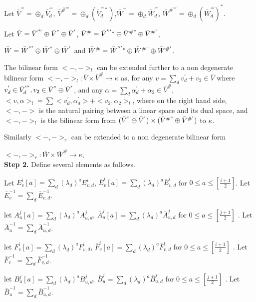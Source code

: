 \def\CTEXPreproc{Created by ctex v0.2.12, don't edit!}\documentclass[11pt]{article}
\begin{document}
\begin{pf}
     Let $\bar{V}^{'''}= \oplus_d \bar{V}^{'''}_d$, $\bar{V}^{\# '''}= \oplus_d ( \bar{V}^{ ''' *}_d ) $,$\bar{W}^{'''}= \oplus_d \bar{W}^{'''}_d$,
     $\bar{W}^{\# '''}= \oplus_d (\bar{W}^{'''}_d )^* $.

     Let $\bar{V}= \bar{V}^{'''}\oplus \bar{V}^{"} \oplus \bar{V}^{'}$,  $\bar{V}^{\#} = \bar{V}^{'''*}\oplus \bar{V}^{\# "} \oplus \bar{V}^{\# '}$,

      $\bar{W}= \bar{W}^{'''}\oplus \bar{W}^{"} \oplus \bar{W}^{'}$ and $\bar{W}^{\#} = \bar{W}^{'''*}\oplus \bar{W}^{\# "} \oplus \bar{W}^{\# '}$.

     The bilinear form $<-,->_l$ can be extended further to a non degenerate bilinear form $<-,->_l : \bar{V} \times \bar{V}^{\#} \rightarrow \kappa  $ as, for any $v= \sum_d v^{'}_d +v_2 \in \bar{V} $ where $v^{'}_d \in \bar{V}^{'''}_d ,  v_2 \in \bar{V}^{"} \oplus \bar{V}^{'} $,
     and any $\alpha =\sum_d  \alpha^{'}_d +\alpha_2 \in \bar{V}^{\#}$,
 $< v,\alpha >_l =\sum < v^{'}_d , \alpha^{'}_d  > + < v_2 ,\alpha_2  >_l  $,
where on the right hand side,   $<-,->$ is the natural pairing between a linear space and its dual space, and $<-,->_l $ is the bilinear form from $ (\bar{V}^{"} \oplus \bar{V}^{'} ) \times  (\bar{V}^{\# "} \oplus \bar{V}^{\# '} ) $  to $\kappa$.

     Similarly  $<-,->_r$ can be  extended to a non degenerate bilinear form

     $<-,->_r : \bar{W}\times \bar{W}^{\#}\rightarrow \kappa$. \\

 \noindent \textbf{ Step 2.} Define several elements as follows.

     Let $E^i _v [a] =\sum_{d} (\lambda_d)^a  E^i _{v,d}$, $\bar{E}^i _v [a] = \sum_{d} (\lambda_d )^a \bar{E}^i _{v,d} $ for $0\leq a\leq [\frac{i+1}{2}]$. Let $\bar{E}^{-1}_v = \sum_{d} \bar{E}^{-1}_{v,d}$.

     let $A^j _u [a] =\sum_{d} (\lambda_d)^a  A^j _{u,d}$, $\bar{A}^j _u [a] =\sum_{d}  (\lambda_d)^a \bar{A}^j _{u,d}$ for $0\leq a\leq [\frac{j+1}{2}]$  . Let $\bar{A}^{-1}_u =\sum_d \bar{A}^{-1}_{u,d} $.

      let  $F^i _v [a]=\sum_{d} (\lambda_d)^a F^i _{v,d}$,  $\bar{F}^i _v [a]= \sum_{d} (\lambda_d )^a \bar{F}^i _{v,d} $  for $ 0\leq a\leq [\frac{i+1}{2}]$ . Let $\bar{F}^{-1}_v =\sum_d \bar{F}^{-1}_{v,d}$.

       let $B^j _u [a] =\sum_{d} (\lambda_d )^a  B^j _{u,d}$, $\bar{B}^j _u =\sum_{d} (\lambda_d)^a  \bar{B}^j _{u,d}$  for $ 0\leq a\leq [\frac{j+1}{2}]$ . Let $\bar{B}^{-1}_u =\sum_d \bar{B}^{-1}_{u,d}$.


\end{pf}
\end{document}
